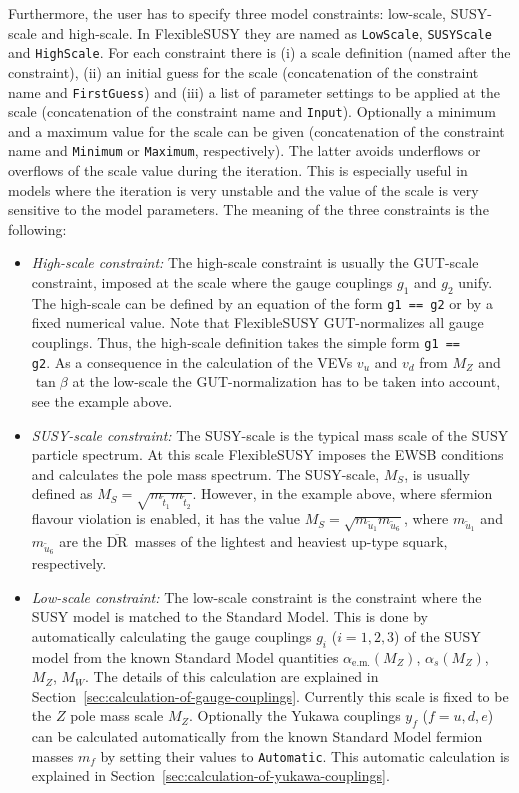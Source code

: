 \documentclass[final,3p,11pt,pdflatex]{elsarticle}
\makeatletter
\newcommand{\fs}{FlexibleSUSY\@\xspace}
\newcommand{\code}[1]{\lstinline|#1|}  %
\newcommand{\textoverline}[1]{$\overline{\mbox{#1}}$}
\newcommand{\DRbar}{\textoverline{DR}\xspace}
\newcommand{\secref}[1]{Section~\ref{#1}}
\makeatother
\begin{document}
Furthermore, the user has to specify three model constraints:
low-scale, SUSY-scale and high-scale.  In \fs they are named as
\code{LowScale}, \code{SUSYScale} and \code{HighScale}.  For each
constraint there is (i) a scale definition (named after the
constraint), (ii) an initial guess for the scale (concatenation of the
constraint name and \code{FirstGuess}) and (iii) a list of parameter
settings to be applied at the scale (concatenation of the constraint
name and \code{Input}).  Optionally a minimum and a maximum value for
the scale can be given (concatenation of the constraint name and
\code{Minimum} or \code{Maximum}, respectively).  The latter avoids
underflows or overflows of the scale value during the iteration.  This
is especially useful in models where the iteration is very unstable
and the value of the scale is very sensitive to the model parameters.
The meaning of the three constraints is the following:
%
\begin{itemize}
\item \emph{High-scale constraint:} The high-scale constraint is
  usually the GUT-scale constraint, imposed at the scale where the
  gauge couplings $g_1$ and $g_2$ unify.  The high-scale can be
  defined by an equation of the form \code{g1 == g2} or by a fixed
  numerical value.  Note that \fs GUT-normalizes all gauge couplings.
  Thus, the high-scale definition takes the simple form \code{g1 ==
    g2}.  As a consequence in the calculation of the VEVs $v_u$ and
  $v_d$ from $M_Z$ and $\tan\beta$ at the low-scale the
  GUT-normalization has to be taken into account, see the example
  above.
%
\item \emph{SUSY-scale constraint:} The SUSY-scale is the typical mass
  scale of the SUSY particle spectrum.  At this scale \fs imposes the
  EWSB conditions and calculates the pole mass spectrum.  The
  SUSY-scale, $M_S$, is usually defined as $M_S =
  \sqrt{m_{\tilde{t}_1}m_{\tilde{t}_2}}$.  However, in the example
  above, where sfermion flavour violation is enabled, it has the value
  $M_S = \sqrt{m_{\tilde{u}_1}m_{\tilde{u}_6}}$, where
  $m_{\tilde{u}_1}$ and $m_{\tilde{u}_6}$ are the \DRbar\ masses of
  the lightest and heaviest up-type squark, respectively.
%
\item \emph{Low-scale constraint:} The low-scale constraint is the
  constraint where the SUSY model is matched to the Standard Model.
  This is done by automatically calculating the gauge couplings $g_i$
  ($i=1,2,3$) of the SUSY model from the known Standard Model
  quantities $\alpha_{\text{e.m.}}(M_Z)$, $\alpha_{s}(M_Z)$, $M_Z$,
  $M_W$.  The details of this calculation are explained in
  \secref{sec:calculation-of-gauge-couplings}.  Currently this scale
  is fixed to be the $Z$ pole mass scale $M_Z$.  Optionally the Yukawa
  couplings $y_f$ ($f=u,d,e$) can be calculated automatically from the
  known Standard Model fermion masses $m_f$ by setting their values to
  \code{Automatic}.  This automatic calculation is explained in
  \secref{sec:calculation-of-yukawa-couplings}.
\end{itemize}
\end{document}
